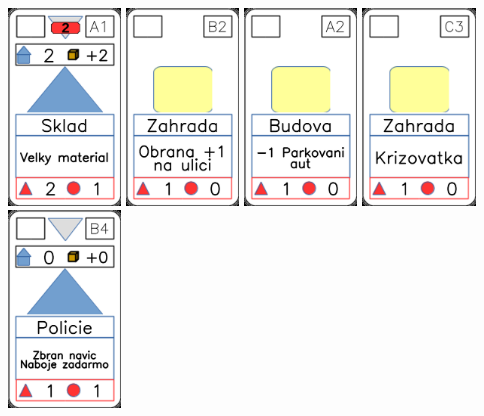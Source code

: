 \documentclass[a4paper]{article}
\begin{document}
	\includegraphics[width=3.0cm]{img-3_15}
	\includegraphics[width=3.0cm]{img-2_21}
	\includegraphics[width=3.0cm]{img-2_1}
	\includegraphics[width=3.0cm]{img-2_27}
	\includegraphics[width=3.0cm]{img-3_8}
\end{document}
